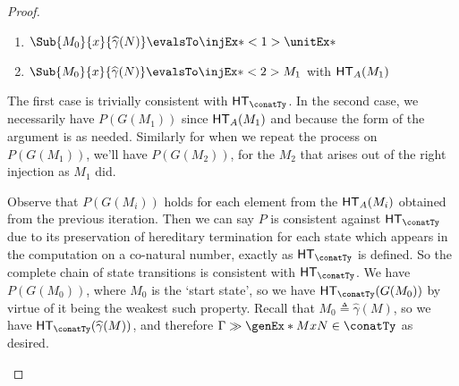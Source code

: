 \documentclass[letterpaper]{article}
\newcommand{\gmhat}[1]{\ensuremath{\widehat{\gamma}(#1)}}
\begin{document}
\begin{proof}
\begin{enumerate}
            \begin{enumerate}
                \item $\Sub{M_0}{x}{\gmhat{N}} \evalsTo \injEx*<1>{\unitEx*}$
                \item $\Sub{M_0}{x}{\gmhat{N}} \evalsTo \injEx*<2>{M_1}$ with $\HT[A](M_1)$
            \end{enumerate}

            The first case is trivially consistent with $\HT[\conatTy]$.
            In the second case, we necessarily have $P(G(M_1))$ since
            $\HT[A](M_1)$ and because the form of the argument is as needed.
            Similarly for when we repeat the process on $P(G(M_1))$, we'll have
            $P(G(M_2))$, for the $M_2$ that arises out of the right injection
            as $M_1$ did.

            Observe that $P(G(M_i))$ holds for each element from the
            $\HT[A](M_i)$ obtained from the previous iteration.
            Then we can say $P$ is consistent against $\HT[\conatTy]$ due to
            its preservation of hereditary termination for each state which
            appears in the computation on a co-natural number, exactly as
            $\HT[\conatTy]$ is defined.
            So the complete chain of state transitions is consistent with
            $\HT[\conatTy]$.
            We have $P(G(M_0))$, where $M_0$ is the `start state', so we have
            $\HT[\conatTy](G(M_0))$ by virtue of it being the weakest such
            property.
            Recall that $M_0 \triangleq \gmhat{M}$, so we have
            $\HT[\conatTy](\gmhat{M})$, and therefore $\Gamma \gg
            \genEx*{M}{x}{N} \in \conatTy$ as desired.
            
            
    \end{enumerate}
\end{proof}
\end{document}
